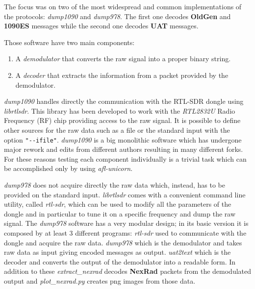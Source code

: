 \documentclass[../main.tex]{subfiles}
\begin{document}
The focus was on two of the most widespread and common implementations of the protocols: \emph{dump1090} and \emph{dump978}. The first one decodes \textbf{OldGen} and \textbf{1090ES} messages while the second one decodes \textbf{UAT} messages.

Those software have two main components:
\begin{enumerate}
  \item A \emph{demodulator} that converts the raw signal into a proper binary string.
  \item A \emph{decoder} that extracts the information from a packet provided by the demodulator.
\end{enumerate}

\emph{dump1090} handles directly the communication with the RTL-SDR dongle using
\emph{librtlsdr}. This library has been developed to work with the
\emph{RTL2832U} Radio Frequency (RF) chip providing access to the raw signal. It
is possible to define other sources for the raw data such as a file or the
standard input with the option \texttt{"-{}-ifile"}. \emph{dump1090} is a big
monolithic software which has undergone major rework and edits from different
authors resulting in many different forks. For these reasons testing each
component individually is a trivial task which can be accomplished only by using
\textit{afl-unicorn}.

\emph{dump978} does not acquire directly the raw data which, instead, has to be
provided on the standard input. \textit{librtlsdr} comes with a convenient
command line utility, called \textit{rtl-sdr}, which can be used to modify all the parameters of the dongle and in particular to tune it on a specific frequency and dump the raw signal.
The \textit{dump978} software has a very modular design; in its basic version it is composed by at least 3 different programs: \textit{rtl-sdr} used to communicate with the dongle and acquire the raw data. \textit{dump978} which is the demodulator and takes raw data as input giving encoded messages as output. \textit{uat2text} which is the decoder and converts the output of the demodulator into a readable form. In addition to these \textit{extract\_nexrad} decodes \textbf{NexRad} packets from the demodulated output and \textit{plot\_nexrad.py} creates png images from those data.
\end{document}
